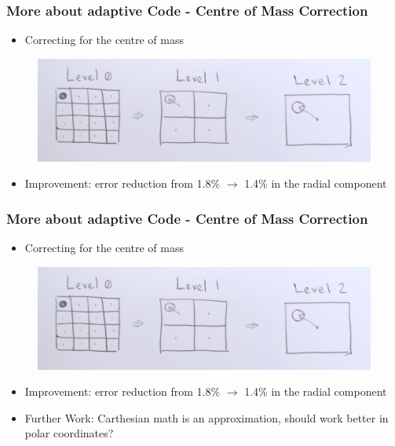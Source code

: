 \documentclass{beamer}
\begin{document}
\begin{frame}
 \frametitle{More about adaptive Code - Centre of Mass Correction}
\begin{itemize}
  \item Correcting for the centre of mass
 \end{itemize}
 \begin{figure}[H]
  \centering
  \includegraphics[width=.7\textwidth]{../../../Sara/plots/COM_correction.png}     
\end{figure}
\begin{itemize}
  \item Improvement: error reduction from 1.8\% $\rightarrow$ 1.4\% in the radial component

 \end{itemize}
\end{frame}
\begin{frame}
 \frametitle{More about adaptive Code - Centre of Mass Correction}
\begin{itemize}
  \item Correcting for the centre of mass
 \end{itemize}
 \begin{figure}[H]
  \centering
  \includegraphics[width=.7\textwidth]{../../../Sara/plots/COM_correction.png}     
\end{figure}
\begin{itemize}
  \item Improvement: error reduction from 1.8\% $\rightarrow$ 1.4\% in the radial component
  \item Further Work: Carthesian math is an approximation, should work better in polar coordinates?
 \end{itemize}
\end{frame}
\end{document}

